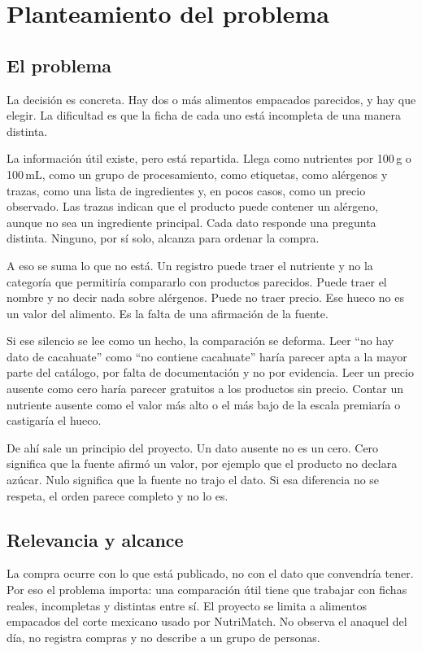 \section{Planteamiento del problema}

\subsection{El problema}

La decisión es concreta. Hay dos o más alimentos empacados parecidos, y hay que elegir. La dificultad es que la ficha de cada uno está incompleta de una manera distinta.

La información útil existe, pero está repartida. Llega como nutrientes por 100\,g o 100\,mL, como un grupo de procesamiento, como etiquetas, como alérgenos y trazas, como una lista de ingredientes y, en pocos casos, como un precio observado. Las trazas indican que el producto puede contener un alérgeno, aunque no sea un ingrediente principal. Cada dato responde una pregunta distinta. Ninguno, por sí solo, alcanza para ordenar la compra.

A eso se suma lo que no está. Un registro puede traer el nutriente y no la categoría que permitiría compararlo con productos parecidos. Puede traer el nombre y no decir nada sobre alérgenos. Puede no traer precio. Ese hueco no es un valor del alimento. Es la falta de una afirmación de la fuente.

Si ese silencio se lee como un hecho, la comparación se deforma. Leer \enquote{no hay dato de cacahuate} como \enquote{no contiene cacahuate} haría parecer apta a la mayor parte del catálogo, por falta de documentación y no por evidencia. Leer un precio ausente como cero haría parecer gratuitos a los productos sin precio. Contar un nutriente ausente como el valor más alto o el más bajo de la escala premiaría o castigaría el hueco.

De ahí sale un principio del proyecto. Un dato ausente no es un cero. Cero significa que la fuente afirmó un valor, por ejemplo que el producto no declara azúcar. Nulo significa que la fuente no trajo el dato. Si esa diferencia no se respeta, el orden parece completo y no lo es.

\subsection{Relevancia y alcance}

La compra ocurre con lo que está publicado, no con el dato que convendría tener. Por eso el problema importa: una comparación útil tiene que trabajar con fichas reales, incompletas y distintas entre sí. El proyecto se limita a alimentos empacados del corte mexicano usado por NutriMatch. No observa el anaquel del día, no registra compras y no describe a un grupo de personas.

